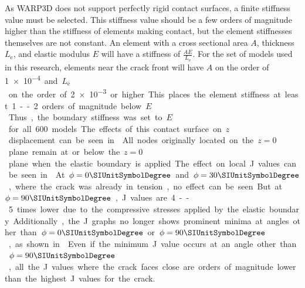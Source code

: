 As WARP3D does not support perfectly rigid contact surfaces, a finite stiffness value must be selected.
This stiffness value should be a few orders of magnitude higher than the stiffness of elements making contact, but the element stiffnesses themselves are not constant.
An element with a cross sectional area \(A\), thickness \(L_\text{e}\), and elastic modulus \(E\) will have a stiffness of \(\frac{AE}{L_\text{e}}\).
For the set of models used in this research, elements near the crack front will have \(A\) on the order of \SI{1e-4} and \(L_\text{e}\) on the order of \SI{2e-3} or higher.
This places the element stiffness at least 1--2 orders of magnitude below \(E\).
Thus, the boundary stiffness was set to \(E\) for all 600 models.
%
The effects of this contact surface on \(z\) displacement can be seen in .
All nodes originally located on the \(z=0\) plane remain at or below the \(z=0\) plane when the elastic boundary is applied.

The effect on local \J values can be seen in .
At \(\phi=0{\SIUnitSymbolDegree}\) and \(\phi=30{\SIUnitSymbolDegree}\), where the crack was already in tension, no effect can be seen.
But at \(\phi=90{\SIUnitSymbolDegree}\), \J values are 4--5 times lower due to the compressive stresses applied by the elastic boundary.
Additionally, the \J graphs no longer shows prominent minima at angles other than \(\phi=0{\SIUnitSymbolDegree}\) or \(\phi=90{\SIUnitSymbolDegree}\), as shown in .
Even if the minimum \J value occurs at an angle other than \(\phi=90{\SIUnitSymbolDegree}\), all the \J values where the crack faces close are orders of magnitude lower than the highest \J values for the crack.

